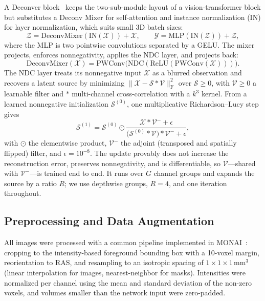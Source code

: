 \documentclass[runningheads,a4paper]{llncs}
\begin{document}
A Deconver block~\cite{ashtari2025deconver} keeps the two-sub-module layout of a vision-transformer block but substitutes a Deconv Mixer for self-attention and instance normalization (IN) for layer normalization, which suits small 3D batch sizes:
\begin{equation}
\label{eq:block}
\mathcal{Z} = \mathrm{DeconvMixer}(\mathrm{IN}(\mathcal{X})) + \mathcal{X},
\qquad
\mathcal{Y} = \mathrm{MLP}(\mathrm{IN}(\mathcal{Z})) + \mathcal{Z},
\end{equation}
where the MLP is two pointwise convolutions separated by a GELU. The mixer projects, enforces nonnegativity, applies the NDC layer, and projects back:
\begin{equation}
\label{eq:mixer}
\mathrm{DeconvMixer}(\mathcal{X}) = \mathrm{PWConv}\bigl(\mathrm{NDC}(\mathrm{ReLU}(\mathrm{PWConv}(\mathcal{X})))\bigr).
\end{equation}
The NDC layer treats its nonnegative input $\mathcal{X}$ as a blurred observation and recovers a latent source by minimizing $\|\mathcal{X}-\mathcal{S}\ast\mathcal{V}\|_\mathrm{F}^2$ over $\mathcal{S}\ge0$, with $\mathcal{V}\ge0$ a learnable filter and $\ast$ multi-channel cross-correlation with a $k^3$ kernel. From a learned nonnegative initialization $\mathcal{S}^{(0)}$, one multiplicative Richardson--Lucy step gives
\begin{equation}
\label{eq:ndc}
\mathcal{S}^{(1)} = \mathcal{S}^{(0)} \odot
\frac{\mathcal{X}\ast\mathcal{V}^{-}+\epsilon}
     {\bigl(\mathcal{S}^{(0)}\ast\mathcal{V}\bigr)\ast\mathcal{V}^{-}+\epsilon},
\end{equation}
with $\odot$ the elementwise product, $\mathcal{V}^{-}$ the adjoint (transposed and spatially flipped) filter, and $\epsilon{=}10^{-8}$. The update provably does not increase the reconstruction error, preserves nonnegativity, and is differentiable, so $\mathcal{V}$---shared with $\mathcal{V}^{-}$---is trained end to end. It runs over $G$ channel groups and expands the source by a ratio $R$; we use depthwise groups, $R{=}4$, and one iteration throughout.

\subsection{Preprocessing and Data Augmentation}

All images were processed with a common pipeline implemented in MONAI~\cite{cardoso2022monai}: cropping to the intensity-based foreground bounding box with a 10-voxel margin, reorientation to RAS, and resampling to an isotropic spacing of $1\times1\times1\,\mathrm{mm}^3$ (linear interpolation for images, nearest-neighbor for masks). Intensities were normalized per channel using the mean and standard deviation of the non-zero voxels, and volumes smaller than the network input were zero-padded.
\end{document}
